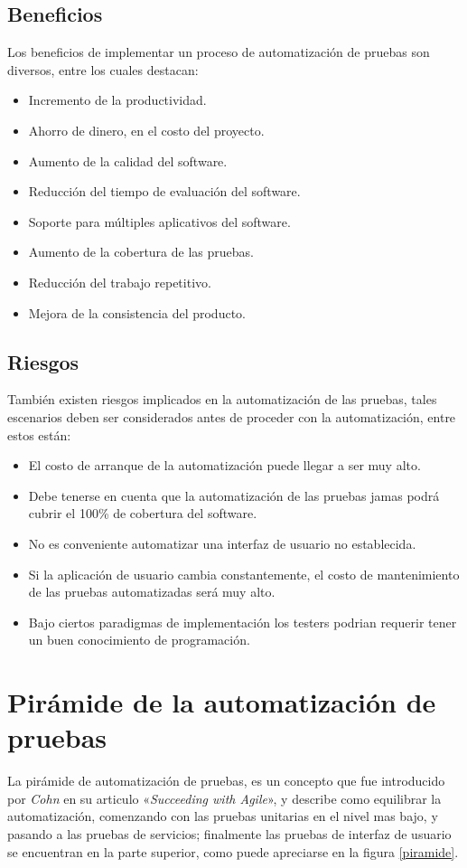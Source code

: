 \subsection{Beneficios}
Los beneficios de implementar un proceso de automatización de pruebas son
diversos, entre los cuales destacan:

\begin{itemize}
    \item Incremento de la productividad.
    \item Ahorro de dinero, en el costo del proyecto.
    \item Aumento de la calidad del software.
    \item Reducción del tiempo de evaluación del software.
    \item Soporte para múltiples aplicativos del software.
    \item Aumento de la cobertura de las pruebas.
    \item Reducción del trabajo repetitivo.
    \item Mejora de la consistencia del producto.
\end{itemize}

\subsection{Riesgos}
También existen riesgos implicados en la automatización de las pruebas, tales
escenarios deben ser considerados antes de proceder con la automatización, entre
estos están:

\begin{itemize}
    \item El costo de arranque de la automatización puede llegar a ser muy alto.
    \item Debe tenerse en cuenta que la automatización de las pruebas jamas
        podrá cubrir el 100\% de cobertura del software.
    \item No es conveniente automatizar una interfaz de usuario no establecida.
    \item Si la aplicación de usuario cambia constantemente, el costo de
        mantenimiento de las pruebas automatizadas será muy alto.
    \item Bajo ciertos paradigmas de implementación los testers podrian requerir
        tener un buen conocimiento de programación.
\end{itemize}

\section{Pirámide de la automatización de pruebas}
La pirámide de automatización de pruebas, es un concepto que fue introducido
por \emph{Cohn} en su articulo «\emph{Succeeding with Agile}», y describe como
equilibrar la automatización, comenzando con las pruebas unitarias en el nivel
mas bajo, y pasando a las pruebas de servicios; finalmente las pruebas de
interfaz de usuario se encuentran en la parte superior, como puede apreciarse en
la figura \ref{piramide}.

